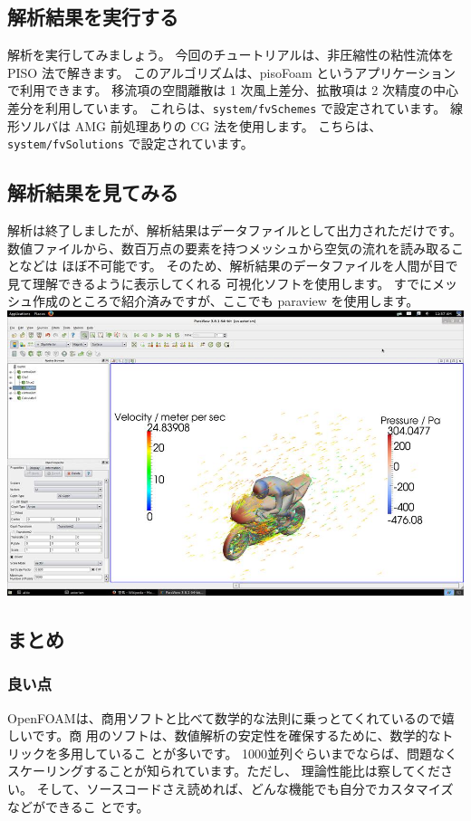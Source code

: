 \documentclass[mingoth,a4paper]{jsarticle}
\begin{document}
\subsection{解析結果を実行する}
解析を実行してみましょう。
今回のチュートリアルは、非圧縮性の粘性流体を PISO 法で解きます。
このアルゴリズムは、pisoFoam というアプリケーションで利用できます。
移流項の空間離散は 1 次風上差分、拡散項は 2 次精度の中心差分を利用しています。
これらは、\verb|system/fvSchemes| で設定されています。
線形ソルバは AMG 前処理ありの CG 法を使用します。
こちらは、\verb|system/fvSolutions| で設定されています。

\subsection{解析結果を見てみる}
解析は終了しましたが、解析結果はデータファイルとして出力されただけです。
数値ファイルから、数百万点の要素を持つメッシュから空気の流れを読み取ることなどは
ほぼ不可能です。
そのため、解析結果のデータファイルを人間が目で見て理解できるように表示してくれる
可視化ソフトを使用します。
すでにメッシュ作成のところで紹介済みですが、ここでも paraview を使用します。\\
\includegraphics[scale=0.5]{image201604/motorbike_velocity_and_pressure.jpg}

\subsection{まとめ}

\subsubsection{良い点}
OpenFOAMは、商用ソフトと比べて数学的な法則に乗っとてくれているので嬉しいです。商
用のソフトは、数値解析の安定性を確保するために、数学的なトリックを多用しているこ
とが多いです。
1000並列ぐらいまでならば、問題なくスケーリングすることが知られています。ただし、
理論性能比は察してください。
そして、ソースコードさえ読めれば、どんな機能でも自分でカスタマイズなどができるこ
とです。
\end{document}
